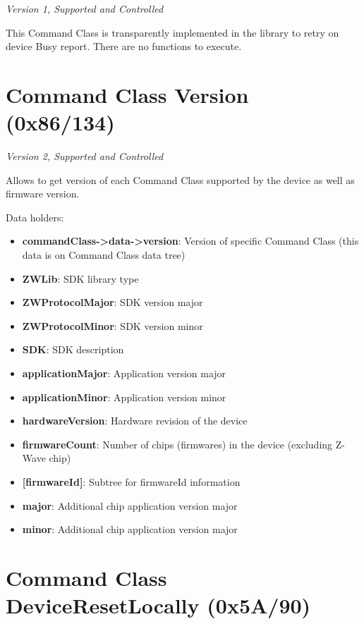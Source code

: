 \textit{Version 1, Supported and Controlled}
\newline

This Command Class is transparently implemented in the library to retry on device Busy report. There are no functions to execute.

\section{Command Class Version (0x86/134)}

\textit{Version 2, Supported and Controlled}
\newline

Allows to get version of each Command Class supported by the device as well as firmware version.
\newline

\noindent
Data holders:

\begin{itemize}
\item \textbf{commandClass->data->version}: Version of specific Command Class (this data is on Command Class data tree)
\item \textbf{ZWLib}: SDK library type
\item \textbf{ZWProtocolMajor}: SDK version major
\item \textbf{ZWProtocolMinor}: SDK version minor
\item \textbf{SDK}: SDK description
\item \textbf{applicationMajor}: Application version major
\item \textbf{applicationMinor}: Application version minor
\item \textbf{hardwareVersion}: Hardware revision of the device
\item \textbf{firmwareCount}: Number of chips (firmwares) in the device (excluding Z-Wave chip)
\item \textbf{[firmwareId]}: Subtree for firmwareId information
\item \qquad\textbf{major}: Additional chip application version major
\item \qquad\textbf{minor}: Additional chip application version major
\end{itemize}


\section{Command Class DeviceResetLocally (0x5A/90)}

